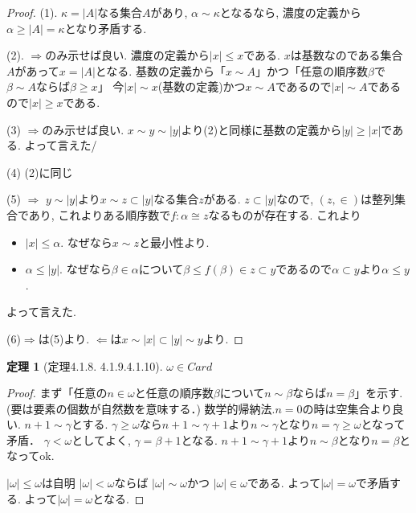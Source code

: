 \documentclass[dvipdfmx,a4paper,11pt]{article}
\theoremstyle{definition}
\newtheorem{thm}{定理}
\begin{document}
\begin{proof}
(1). $\kappa = |A|$なる集合$A$があり, $\alpha  \sim \kappa$となるなら, 濃度の定義から$\alpha \ge |A| = \kappa$となり矛盾する.

(2). $\Rightarrow$のみ示せば良い. 
濃度の定義から$|x| \le x$である. 
$x$は基数なのである集合$A$があって$x=|A|$となる. 
基数の定義から「$x \sim A$」かつ「任意の順序数$\beta$で$\beta \sim A$ならば$\beta \ge x$」
今$|x|\sim x$(基数の定義)かつ$x \sim A$であるので$|x| \sim A$であるので$|x| \ge x$である. 

(3) $\Rightarrow$のみ示せば良い. 
$x \sim y \sim |y|$より(2)と同様に基数の定義から$|y|\ge |x|$である. よって言えた/ 

(4) (2)に同じ

(5)  $\Rightarrow$ $y \sim |y|$より$x \sim z \subset |y|$なる集合$z$がある. 
$z \subset |y|$なので, $(z, \in)$は整列集合であり, これよりある順序数で$f: \alpha \cong z$なるものが存在する. これより
\begin{itemize}
\item $|x| \le \alpha$. なぜなら$x \sim z$と最小性より.
\item $\alpha \le |y|$. なぜなら$\beta \in \alpha$について$\beta \le f(\beta) \in z \subset y$であるので$\alpha \subset y$より$\alpha \le y$.
\end{itemize}
よって言えた. 

(6)$\Rightarrow$は(5)より. 
$\Leftarrow$は$x \sim |x| \subset |y| \sim y$より. 
\end{proof}

 \begin{tcolorbox}
 [colback = white, colframe = green!35!black, fonttitle = \bfseries,breakable = true]
\begin{thm}[定理4.1.8. 4.1.9.4.1.10]
$\omega \in Card$
\end{thm}
\end{tcolorbox}
\begin{proof}
まず「任意の$n \in \omega$と任意の順序数$\beta$について$n \sim \beta$ならば$n=\beta$」を示す.(要は要素の個数が自然数を意味する．)
数学的帰納法.$n=0$の時は空集合より良い. 
$n+1\sim \gamma$とする. 
$\gamma \ge \omega$なら$n+1 \sim \gamma +1$より$n\sim \gamma$となり$n=\gamma \ge \omega$となって矛盾．
$\gamma <\omega$としてよく, $\gamma = \beta +1$となる. 
$n+1 \sim \gamma +1$より$n\sim \beta$となり$n=\beta$となってok.

$|\omega| \le \omega$は自明
$|\omega| < \omega$ならば
$|\omega| \sim \omega$かつ $|\omega| \in \omega$である.
よって$|\omega| =\omega$で矛盾する. 
よって$|\omega| =\omega$となる. 
\end{proof}
\end{document}
